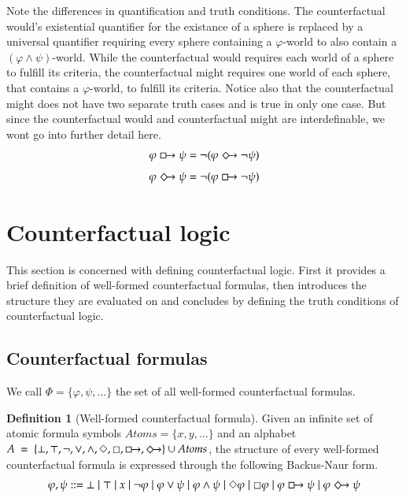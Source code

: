\documentclass[a4paper,american,10pt]{paper}
\theoremstyle{definition}\newtheorem{definition}{Definition}
\begin{document}
\noindent Note the differences in quantification and truth conditions. The counterfactual would's existential quantifier for the existance of a sphere is replaced by a universal quantifier requiring every sphere containing a $\varphi$-world to also contain a $(\varphi\wedge\psi)$-world. While the counterfactual would requires each world of a sphere to fulfill its criteria, the counterfactual might requires one world of each sphere, that contains a $\varphi$-world, to fulfill its criteria. Notice also that the counterfactual might does not have two separate truth cases and is true in only one case. But since the counterfactual would and counterfactual might are interdefinable, we wont go into further detail here.
\begin{equation}
\varphi\boxright\psi = \neg (\varphi\Diamondright\neg\psi )
\end{equation}
\begin{equation}
\varphi\Diamondright\psi = \neg (\varphi\boxright\neg\psi )
\end{equation}

\section{Counterfactual logic}
This section is concerned with defining counterfactual logic. First it provides a brief definition of well-formed counterfactual formulas, then introduces the structure they are evaluated on and concludes by defining the truth conditions of counterfactual logic.

\subsection{Counterfactual formulas}
We call $\Phi = \{\varphi ,\psi ,...\}$ the set of all well-formed counterfactual formulas.
\begin{definition}[Well-formed counterfactual formula]
Given an infinite set of atomic formula symbols $Atoms = \{ x, y, ...\}$ and an alphabet $A~=~\{\bot ,\top ,\neg ,\vee ,\wedge ,\Diamond ,\Box ,\boxright ,\Diamondright\}\cup Atoms$, the structure of every well-formed counterfactual formula is expressed through the following Backus-Naur form.
\begin{equation}
\varphi, \psi ::= \bot \mid \top \mid x \mid \neg \varphi \mid \varphi \vee \psi \mid \varphi \wedge \psi \mid \Diamond \varphi \mid \Box \varphi \mid \varphi \boxright \psi \mid \varphi \Diamondright \psi
\end{equation}
\end{definition}
\end{document}
